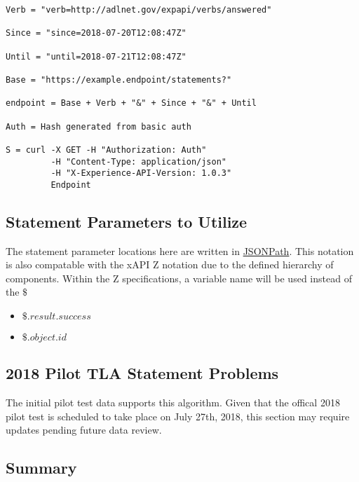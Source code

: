 \documentclass{article}
\begin{document}
\begin{lstlisting}[frame=single]
Verb = "verb=http://adlnet.gov/expapi/verbs/answered"

Since = "since=2018-07-20T12:08:47Z"

Until = "until=2018-07-21T12:08:47Z"

Base = "https://example.endpoint/statements?"

endpoint = Base + Verb + "&" + Since + "&" + Until

Auth = Hash generated from basic auth

S = curl -X GET -H "Authorization: Auth"
         -H "Content-Type: application/json"
         -H "X-Experience-API-Version: 1.0.3"
         Endpoint
\end{lstlisting}

\subsection{Statement Parameters to Utilize}

The statement parameter locations here are written in
\href{http://goessner.net/articles/JsonPath/}{JSONPath}. This notation
is also compatable with the xAPI Z notation due to the defined
hierarchy of components. Within the Z specifications, a variable name
will be used instead of the $\$$
\begin{itemize}
\item $\$.result.success$
\item $\$.object.id$
\end{itemize}

\subsection{2018 Pilot TLA Statement Problems}
The initial pilot test data supports this algorithm.
Given that the offical 2018 pilot test is scheduled to take place on July
27th, 2018, this section may require updates pending future data review.

\subsection{Summary}
\end{document}
